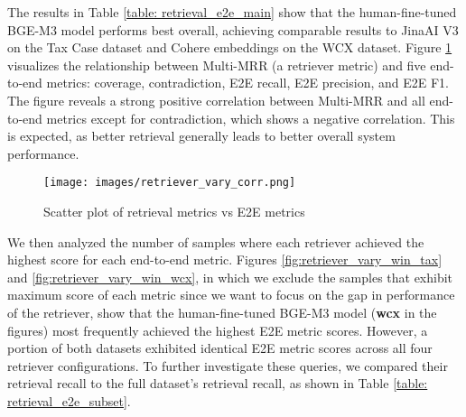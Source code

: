 
The results in Table \ref{table: retrieval_e2e_main} show that the human-fine-tuned BGE-M3 model performs best overall, achieving comparable results to JinaAI V3 on the Tax Case dataset and Cohere embeddings on the WCX dataset. Figure \ref{fig: retriever_vary_corr} visualizes the relationship between Multi-MRR (a retriever metric) and five end-to-end metrics: coverage, contradiction, E2E recall, E2E precision, and E2E F1. The figure reveals a strong positive correlation between Multi-MRR and all end-to-end metrics except for contradiction, which shows a negative correlation. This is expected, as better retrieval generally leads to better overall system performance.

\begin{figure}[ht]
\centering
\texttt{[image: images/retriever\_vary\_corr.png]}
\caption{Scatter plot of retrieval metrics vs E2E metrics}
\label{fig: retriever_vary_corr}
\end{figure}


We then analyzed the number of samples where each retriever achieved the highest score for each end-to-end metric. Figures \ref{fig:retriever_vary_win_tax} and \ref{fig:retriever_vary_win_wcx}, in which we exclude the samples that exhibit maximum score of each metric since we want to focus on the gap in performance of the retriever, show that the human-fine-tuned BGE-M3 model (\textbf{wcx} in the figures) most frequently achieved the highest E2E metric scores. However, a portion of both datasets exhibited identical E2E metric scores across all four retriever configurations. To further investigate these queries, we compared their retrieval recall to the full dataset's retrieval recall, as shown in Table \ref{table: retrieval_e2e_subset}.

